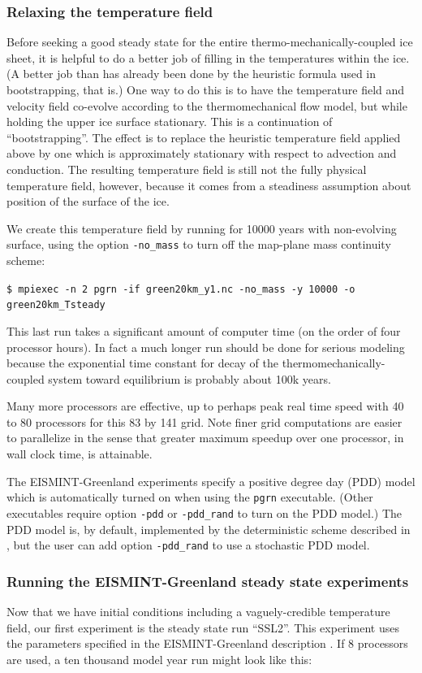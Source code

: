 \documentclass[11pt,final]{amsart}
\begin{document}
\subsubsection*{Relaxing the temperature field}  Before seeking a good steady state for the entire thermo-mechanically-coupled ice sheet, it is helpful to do a better job of filling in the temperatures within the ice.  (A better job than has already been done by the heuristic formula used in bootstrapping, that is.)  One way to do this is to have the temperature field and velocity field co-evolve according to the thermomechanical flow model, but while holding the upper ice surface stationary.  This is a continuation of ``bootstrapping''.  The effect is to replace the heuristic temperature field applied above by one which is approximately stationary with respect to advection and conduction.  The resulting temperature field is still not the fully physical temperature field, however, because it comes from a steadiness assumption about position of the surface of the ice.

We create this temperature field by running for 10000 years with non-evolving surface, using the option \verb|-no_mass| to turn off the map-plane mass continuity scheme:

\verb|$ mpiexec -n 2 pgrn -if green20km_y1.nc -no_mass -y 10000 -o green20km_Tsteady|

\noindent This last run takes a significant amount of computer time (on the order of four processor hours).  In fact a much longer run should be done for serious modeling because the exponential time constant for decay of the thermomechanically-coupled system toward equilibrium is probably about 100k years.

Many more processors are effective, up to perhaps peak real time speed with 40 to 80 processors for this 83 by 141 grid.  Note finer grid computations are easier to parallelize in the sense that greater maximum speedup over one processor, in wall clock time, is attainable.

The EISMINT-Greenland experiments \cite{RitzEISMINT} specify a positive degree day (PDD) model which is automatically turned on when using the \verb|pgrn| executable.  (Other executables require option \verb|-pdd| or \verb|-pdd_rand| to turn on the PDD model.)  The PDD model is, by default, implemented by the deterministic scheme described in \cite{CalovGreve05}, but the user can add option \verb|-pdd_rand| to use a stochastic PDD model.

\subsubsection*{Running the EISMINT-Greenland steady state experiments}  Now that we have initial conditions including a vaguely-credible temperature field, our first experiment is the steady state run ``SSL2''.  This experiment uses the parameters specified in the EISMINT-Greenland description \cite{RitzEISMINT}.  If 8 processors are used, a ten thousand model year run might look like this:
\end{document}
